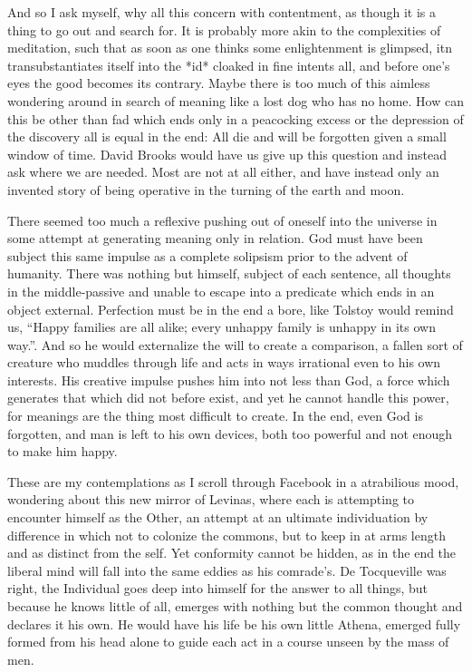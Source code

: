 \documentclass[ebook, 10pt, openright, onecolumn]{memoir}
\newcommand*\td[1]{
  \todo[inline]{
     #1 
  }
}
\newcommand*\finish{\td{ ----- Finish this section -----}}
\begin{document}
And so I ask myself, why all this concern with contentment, as though it is a
thing to go out and search for.  It is probably more akin to the complexities of
meditation, such that as soon as one thinks some enlightenment is glimpsed, itn
transubstantiates itself into the *id* cloaked in fine intents all, and before
one's eyes the good becomes its contrary.  Maybe there is too much of this
aimless wondering around in search of meaning like a lost dog who has no home.
How can this be other than fad which ends only in a peacocking excess or the
depression of the discovery all is equal in the end: All die and will be
forgotten given a small window of time.  David Brooks would have us give up this
question and instead ask where we are needed.  Most are not at all either, and
have instead only an invented story of being operative in the turning of the
earth and moon. 

\finish{}

There seemed too much a reflexive pushing out of oneself into the universe in
some attempt at generating meaning only in relation.  God must have been subject
this same impulse as a complete solipsism prior to the advent of humanity.  There
was nothing but himself, subject of each sentence, all thoughts in the
middle-passive and unable to escape into a predicate which ends in an object
external.  Perfection must be in the end a bore, like Tolstoy would remind us,
``Happy families are all alike; every unhappy family is unhappy in its own
way.''.  And so he would externalize the will to create a comparison, a fallen
sort of creature who muddles through life and acts in ways irrational even to
his own interests.  His creative impulse pushes him into not less than God, a
force which generates that which did not before exist, and yet he cannot handle
this power, for meanings are the thing most difficult to create.  In the end,
even God is forgotten, and man is left to his own devices, both too powerful and
not enough to make him happy.

These are my contemplations as I scroll through Facebook in a atrabilious mood,
wondering about this new mirror of Levinas, where each is attempting to encounter
himself as the Other, an attempt at an ultimate individuation by difference in
which not to colonize the commons, but to keep in at arms length and as distinct
from the self.  Yet conformity cannot be hidden, as in the end the liberal mind
will fall into the same eddies as his comrade's. De Tocqueville was right, the
Individual goes deep into himself for the answer to all things, but because he
knows little of all, emerges with nothing but the common thought and declares it
his own.  He would have his life be his own little Athena, emerged fully formed
from his head alone to guide each act in a course unseen by the mass of men.
\end{document}
